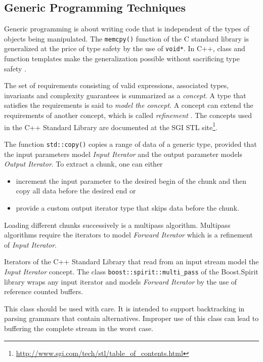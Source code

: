 \documentclass[a4paper,parskip=half,twocolumn]{scrartcl}
\begin{document}
\subsection{Generic Programming Techniques}

Generic programming is about writing code that is independent of the types of
objects being manipulated. The \texttt{memcpy()} function of the C standard
library is generalized at the price of type safety by the use of \texttt{void*}.
In C++, class and function templates make the generalization possible without
sacrificing type safety
\cite{Alexandrescu:2001:MCD:377789,Meyers:2005:ECS:1051335}.

The set of requirements consisting of valid expressions, associated types,
invariants and complexity guarantees is summarized as a \emph{concept}. A type
that satisfies the requirements is said to \emph{model the concept}. A concept
can extend the requirements of another concept, which is called
\emph{refinement} \cite{gregor08:devx_concepts}. The concepts used in the C++
Standard Library are documented at the SGI STL
site\footnote{\url{http://www.sgi.com/tech/stl/table_of_contents.html}}.

The function \texttt{std::copy()} copies a range of data of a generic type,
provided that the input parameters model \emph{Input Iterator} and the output
parameter models \emph{Output Iterator}. To extract a chunk, one can either
\begin{itemize}
  \item increment the input parameter to the desired begin of the chunk and then
  copy all data before the desired end or
  \item provide a custom output iterator type that skips data before the chunk.
\end{itemize}

Loading different chunks successively is a multipass algorithm. Multipass
algorithms require the iterators to model \emph{Forward Iterator} which is a
refinement of \emph{Input Iterator}.

Iterators of the C++ Standard Library that read from an input stream model the
\emph{Input Iterator} concept. The class \texttt{boost::spirit::multi\_pass} of
the Boost.Spirit library wraps any input iterator and models \emph{Forward
Iterator} by the use of reference counted buffers.

This class should be used with care. It is intended to support backtracking in
parsing grammars that contain alternatives. Improper use of this class can lead
to buffering the complete stream in the worst case.
\end{document}
